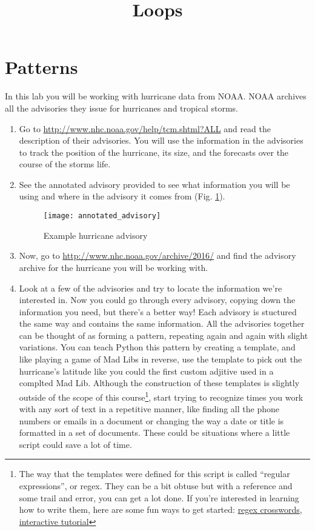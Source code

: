 \documentclass{article}
\begin{document}
\title{Loops}
\maketitle

\section{Patterns}
In this lab you will be working with hurricane data from NOAA.  NOAA archives all the advisories they issue for hurricanes and tropical storms.  
\begin{enumerate}
    \item Go to \url{http://www.nhc.noaa.gov/help/tcm.shtml?ALL} and read the description of their advisories.  You will use the information in the advisories to track the position of the hurricane, its size, and the forecasts over the course of the storms life.  
    \item See the annotated advisory provided to see what information you will be using and where in the advisory it comes from (Fig. \ref{fig:sampleadvisory}).

\begin{figure}
    \texttt{[image: annotated\_advisory]}
    \caption{Example hurricane advisory}
    \label{fig:sampleadvisory}
\end{figure}

    \item Now, go to \url{http://www.nhc.noaa.gov/archive/2016/} and find the advisory archive for the hurricane you will be working with.  
    \item Look at a few of the advisories and try to locate the information we're interested in.  Now you could go through every advisory, copying down the information you need, but there's a better way!  Each advisory is stuctured the same way and contains the same information.  All the advisories together can be thought of as forming a pattern, repeating again and again with slight variations. You can teach Python this pattern by creating a template, and like playing a game of Mad Libs in reverse, use the template to pick out the hurricane's latitude like you could the first custom adjitive used in a complted Mad Lib.  Although the construction of these templates is slightly outside of the scope of this course\footnote{The way that the templates were defined for this script is called ``regular expressions'', or regex.  They can be a bit obtuse but with a reference and some trail and error, you can get a lot done.  If you're interested in learning how to write them, here are some fun ways to get started: \href{https://regexcrossword.com/howtoplay}{regex crosswords}, \href{http://regexone.com/}{interactive tutorial}}, start trying to recognize times you work with any sort of text in a repetitive manner, like finding all the phone numbers or emails in a document or changing the way a date or title is formatted in a set of documents.  These could be situations where a little script could save a lot of time.
\end{enumerate}
\end{document}
